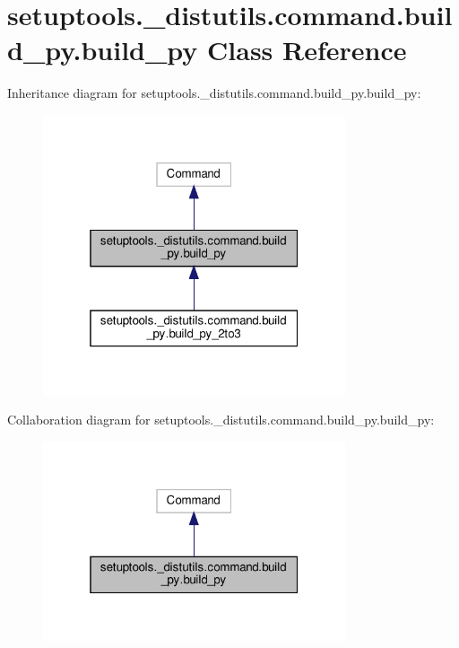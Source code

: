 \hypertarget{classsetuptools_1_1__distutils_1_1command_1_1build__py_1_1build__py}{}\section{setuptools.\+\_\+distutils.\+command.\+build\+\_\+py.\+build\+\_\+py Class Reference}
\label{classsetuptools_1_1__distutils_1_1command_1_1build__py_1_1build__py}


Inheritance diagram for setuptools.\+\_\+distutils.\+command.\+build\+\_\+py.\+build\+\_\+py\+:
\nopagebreak
\begin{figure}[H]
\begin{center}
\leavevmode
\includegraphics[width=253pt]{classsetuptools_1_1__distutils_1_1command_1_1build__py_1_1build__py__inherit__graph}
\end{center}
\end{figure}


Collaboration diagram for setuptools.\+\_\+distutils.\+command.\+build\+\_\+py.\+build\+\_\+py\+:
\nopagebreak
\begin{figure}[H]
\begin{center}
\leavevmode
\includegraphics[width=253pt]{classsetuptools_1_1__distutils_1_1command_1_1build__py_1_1build__py__coll__graph}
\end{center}
\end{figure}
